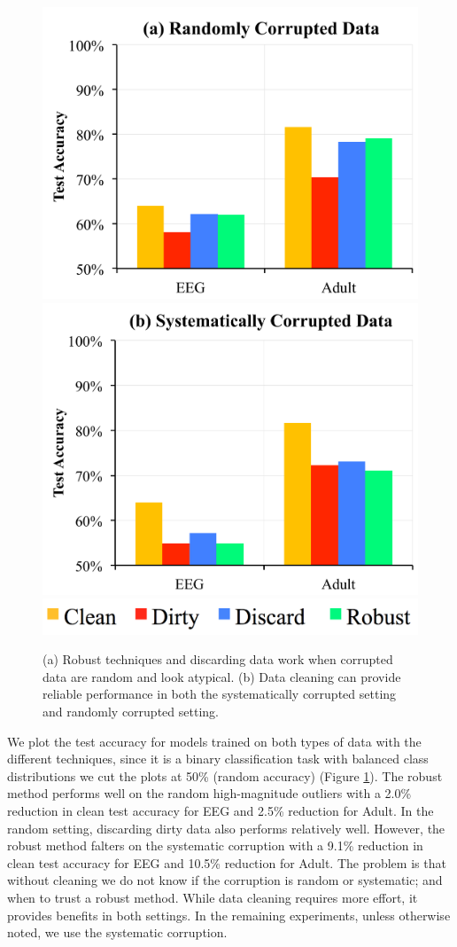 \begin{figure}[ht!]
\centering
 \includegraphics[width=0.49\columnwidth]{exp/exp2.pdf}
 \includegraphics[width=0.49\columnwidth]{exp/exp1.pdf}
 \includegraphics[width=0.5\columnwidth]{exp/legend-1.png}\vspace{-1em}
 \caption{(a) Robust techniques and discarding data work when corrupted data are random and look atypical. (b) Data cleaning can provide reliable performance in both the systematically corrupted setting and randomly corrupted setting.\label{sys-rand}}
\end{figure}

We plot the test accuracy for models trained on both types of data with the different techniques, since it is a binary classification task with balanced class distributions we cut the plots at 50\% (random accuracy) (Figure \ref{sys-rand}).
The robust method performs well on the random high-magnitude outliers with a 2.0\% reduction in clean test accuracy for EEG and 2.5\% reduction for Adult.
In the random setting, discarding dirty data also performs relatively well.
However, the robust method falters on the systematic corruption with a 9.1\% reduction in clean test accuracy for EEG and 10.5\% reduction for Adult.
The problem is that without cleaning we do not know if the corruption is random or systematic; and when to trust a robust method.
While data cleaning requires more effort, it provides benefits in both settings.
In the remaining experiments, unless otherwise noted, we use the systematic corruption.

